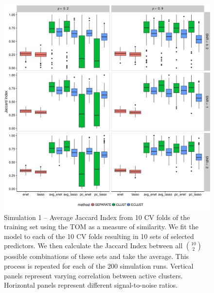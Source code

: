 \begin{appendices}
\begin{figure}[H]
	\centering
	\includegraphics[scale=0.6, keepaspectratio]{./figs/hydra/results/figures/sim1-sept10/jacc_TOM_sim1.png}
	\caption{Simulation 1 -- Average Jaccard Index from 10 CV folds of the training set using the TOM as a measure of similarity. We fit the model to each of the 10 CV folds resulting in 10 sets of selected predictors. We then calculate the Jaccard Index between all $\binom{10}{2}$ possible combinations of these sets and take the average. This process is repeated for each of the 200 simulation runs. Vertical panels represent varying correlation between active clusters. Horizontal panels represent different signal-to-noise ratios.}
	\label{fig:jacc_TOM_sim1}
\end{figure}



\end{appendices}
